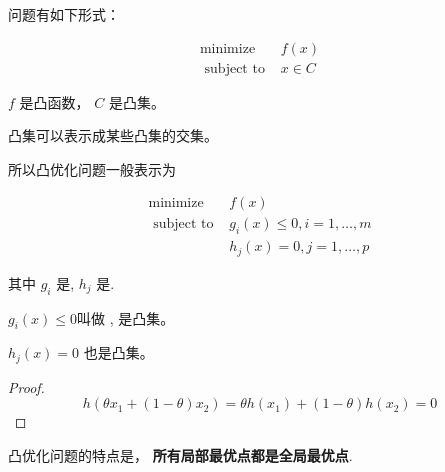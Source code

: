 \begin{definition}[凸优化]
    问题有如下形式：

    \begin{equation}
    \begin{array}{ll}
    \operatorname{minimize} & f(x) \\
    \text { subject to } & x \in C
    \end{array}
    \end{equation}
    
    $ f $ 是凸函数， $ C $ 是凸集。
\end{definition}

\begin{corollary}
    凸集可以表示成某些凸集的交集。
\end{corollary}

所以凸优化问题一般表示为

\begin{definition}[凸优化问题]
    \label{def:convex-problem}

    \begin{equation}
    \begin{array}{ll}
    \operatorname{minimize} & f(x) \\
    \text { subject to } & g_{i}(x) \leqslant 0, i=1, \ldots, m \\
    & h_{j}(x)=0, j=1, \ldots, p
    \end{array}
    \end{equation}

    其中 $ g_{i} $ 是, $ h_{j} $ 是. 
\end{definition}

$ g_{i}(x) \leqslant 0 $叫做 , 是凸集。

\begin{theorem}
    $ h_{j}(x)=0 $ 也是凸集。
\end{theorem}

\begin{proof}
    \begin{equation} h\left(\theta x_{1}+(1-\theta) x_{2}\right)=\theta h\left(x_{1}\right)+(1-\theta) h\left(x_{2}\right)=0 \end{equation}
\end{proof}

凸优化问题的特点是， \textbf{所有局部最优点都是全局最优点}.

